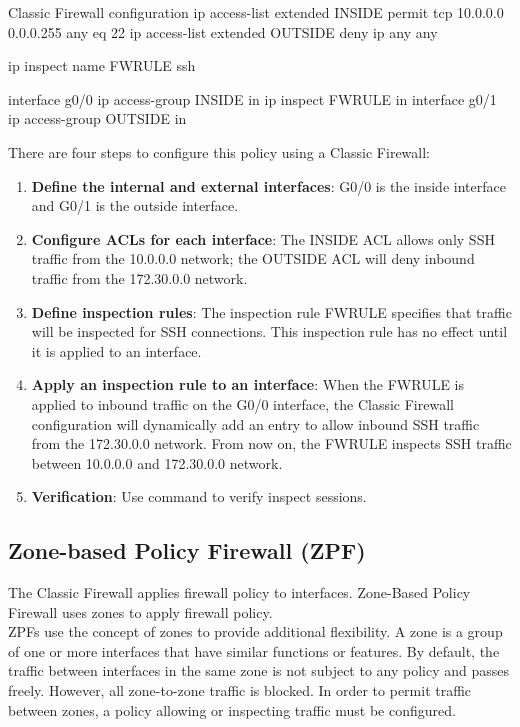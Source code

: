 \begin{sexylisting}{Classic Firewall configuration}
ip access-list extended INSIDE
  permit tcp 10.0.0.0 0.0.0.255 any eq 22
ip access-list extended OUTSIDE
  deny ip any any

ip inspect name FWRULE ssh

interface g0/0
  ip access-group INSIDE in
  ip inspect FWRULE in
interface g0/1
  ip access-group OUTSIDE in
\end{sexylisting}

There are four steps to configure this policy using a Classic Firewall:

\begin{enumerate}
\item \textbf{Define the internal and external interfaces}: G0/0 is the inside interface and G0/1 is the outside interface.
\item \textbf{Configure ACLs for each interface}: The INSIDE ACL allows only SSH traffic from the 10.0.0.0 network; the OUTSIDE ACL will deny inbound traffic from the 172.30.0.0 network.
\item \textbf{Define inspection rules}: The inspection rule FWRULE specifies that traffic will be inspected for SSH connections. This inspection rule has no effect until it is applied to an interface.
\item \textbf{Apply an inspection rule to an interface}: When the FWRULE is applied to inbound traffic on the G0/0 interface, the Classic Firewall configuration will dynamically add an entry to allow inbound SSH traffic from the 172.30.0.0 network. From now on, the FWRULE inspects SSH traffic between 10.0.0.0 and 172.30.0.0 network.
\item \textbf{Verification}: Use  command to verify inspect sessions.
\end{enumerate}

\subsection{Zone-based Policy Firewall (ZPF)}\label{sec:ZPF}

The Classic Firewall applies firewall policy to interfaces. Zone-Based Policy Firewall uses zones to apply firewall policy.\\

ZPFs use the concept of zones to provide additional flexibility. A zone is a group of one or more interfaces that have similar functions or features. By default, the traffic between interfaces in the same zone is not subject to any policy and passes freely. However, all zone-to-zone traffic is blocked. In order to permit traffic between zones, a policy allowing or inspecting traffic must be configured.\\

